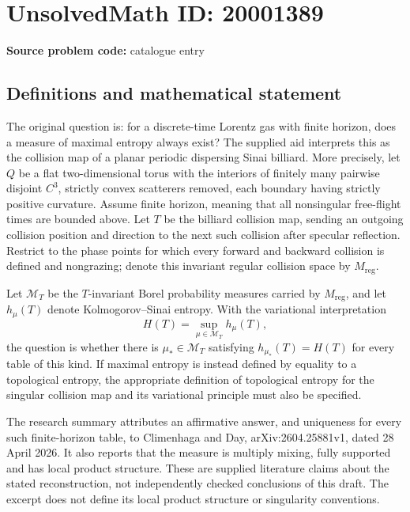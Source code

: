 \documentclass[11pt]{article}
\begin{document}
\section*{UnsolvedMath ID: 20001389}
\textbf{Source problem code:} catalogue entry
\subsection{Definitions and mathematical statement}
The original question is: for a discrete-time Lorentz gas with finite horizon, does a measure of maximal entropy always exist? The supplied aid interprets this as the collision map of a planar periodic dispersing Sinai billiard. More precisely, let \(Q\) be a flat two-dimensional torus with the interiors of finitely many pairwise disjoint \(C^3\), strictly convex scatterers removed, each boundary having strictly positive curvature. Assume finite horizon, meaning that all nonsingular free-flight times are bounded above. Let \(T\) be the billiard collision map, sending an outgoing collision position and direction to the next such collision after specular reflection. Restrict to the phase points for which every forward and backward collision is defined and nongrazing; denote this invariant regular collision space by \(M_{\mathrm{reg}}\).

Let \(\mathcal M_T\) be the \(T\)-invariant Borel probability measures carried by \(M_{\mathrm{reg}}\), and let \(h_\mu(T)\) denote Kolmogorov--Sinai entropy. With the variational interpretation
\[
 H(T)=\sup_{\mu\in\mathcal M_T}h_\mu(T),
\]
the question is whether there is \(\mu_*\in\mathcal M_T\) satisfying \(h_{\mu_*}(T)=H(T)\) for every table of this kind. If maximal entropy is instead defined by equality to a topological entropy, the appropriate definition of topological entropy for the singular collision map and its variational principle must also be specified.

The research summary attributes an affirmative answer, and uniqueness for every such finite-horizon table, to Climenhaga and Day, arXiv:2604.25881v1, dated 28 April 2026. It also reports that the measure is multiply mixing, fully supported and has local product structure. These are supplied literature claims about the stated reconstruction, not independently checked conclusions of this draft. The excerpt does not define its local product structure or singularity conventions.
\end{document}
